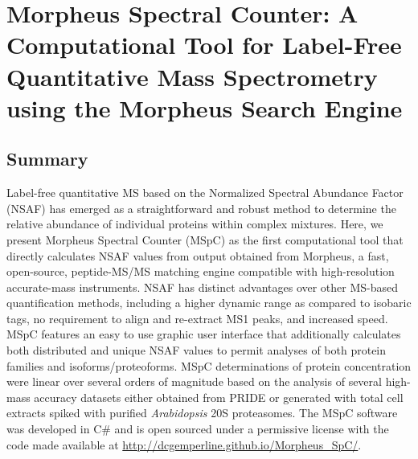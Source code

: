 \chapter{Morpheus Spectral Counter: A Computational Tool for Label-Free Quantitative Mass Spectrometry using the Morpheus Search Engine}

\section{Summary}
Label-free quantitative MS based on the Normalized Spectral Abundance Factor (NSAF) has emerged as a straightforward and robust method to determine the relative abundance of individual proteins within complex mixtures.
Here, we present Morpheus Spectral Counter (MSpC) as the first computational tool that directly calculates NSAF values from output obtained from Morpheus, a fast, open-source, peptide-MS/MS matching engine compatible with high-resolution accurate-mass instruments.
NSAF has distinct advantages over other MS-based quantification methods, including a higher dynamic range as compared to isobaric tags, no requirement to align and re-extract MS1 peaks, and increased speed.
MSpC features an easy to use graphic user interface that additionally calculates both distributed and unique NSAF values to permit analyses of both protein families and isoforms/proteoforms.
MSpC determinations of protein concentration were linear over several orders of magnitude based on the analysis of several high-mass accuracy datasets either obtained from PRIDE or generated with total cell extracts spiked with purified \textit{Arabidopsis} 20S proteasomes.
The MSpC software was developed in C\# and is open sourced under a permissive license with the code made available at \url{http://dcgemperline.github.io/Morpheus_SpC/}. 

